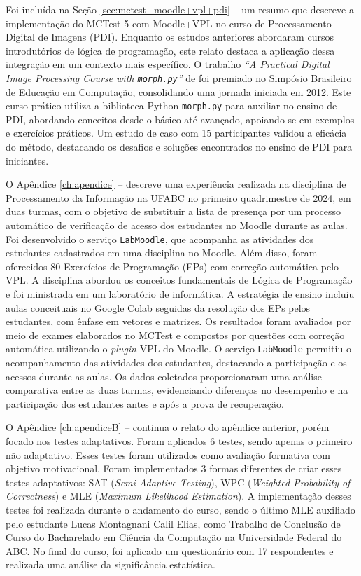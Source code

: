 Foi incluída na Seção \ref{sec:mctest+moodle+vpl+pdi} --  um resumo que descreve a implementação do MCTest-5 com Moodle+VPL no curso de Processamento Digital de Imagens (PDI). Enquanto os estudos anteriores abordaram cursos introdutórios de lógica de programação, este relato destaca a aplicação dessa integração em um contexto mais específico. O trabalho \textit{``A Practical Digital Image Processing Course with \texttt{morph.py}''} de  foi premiado no Simpósio Brasileiro de Educação em Computação, consolidando uma jornada iniciada em 2012. Este curso prático utiliza a biblioteca Python \texttt{morph.py} para auxiliar no ensino de PDI, abordando conceitos desde o básico até avançado, apoiando-se em exemplos e exercícios práticos. Um estudo de caso com 15 participantes validou a eficácia do método, destacando os desafios e soluções encontrados no ensino de PDI para iniciantes.

O Apêndice \ref{ch:apendice} --  descreve uma experiência realizada na disciplina de Processamento da Informação na UFABC no primeiro quadrimestre de 2024, em duas turmas, com o objetivo de substituir a lista de presença por um processo automático de verificação de acesso dos estudantes no Moodle durante as aulas. Foi desenvolvido o serviço \texttt{LabMoodle}, que acompanha as atividades dos estudantes cadastrados em uma disciplina no Moodle. Além disso, foram oferecidos 80 Exercícios de Programação (EPs) com correção automática pelo VPL. A disciplina abordou os conceitos fundamentais de Lógica de Programação e foi ministrada em um laboratório de informática. A estratégia de ensino incluiu aulas conceituais no Google Colab seguidas da resolução dos EPs pelos estudantes, com ênfase em vetores e matrizes. Os resultados foram avaliados por meio de exames elaborados no MCTest e compostos por questões com correção automática utilizando o \textit{plugin} VPL do Moodle. O serviço \texttt{LabMoodle} permitiu o acompanhamento das atividades dos estudantes, destacando a participação e os acessos durante as aulas. Os dados coletados proporcionaram uma análise comparativa entre as duas turmas, evidenciando diferenças no desempenho e na participação dos estudantes antes e após a prova de recuperação. 

O Apêndice \ref{ch:apendiceB} --  continua o relato do apêndice anterior, porém focado nos testes adaptativos. Foram aplicados 6 testes, sendo apenas o primeiro não adaptativo. Esses testes foram utilizados como avaliação formativa com objetivo motivacional. Foram implementados 3 formas diferentes de criar esses testes adaptativos: SAT (\textit{Semi-Adaptive Testing}), WPC (\textit{Weighted Probability of Correctness}) e MLE (\textit{Maximum Likelihood Estimation}). A implementação desses testes foi realizada durante o andamento do curso, sendo o último MLE auxiliado pelo estudante Lucas Montagnani Calil Elias, como Trabalho de Conclusão de Curso do Bacharelado em Ciência da Computação na Universidade Federal do ABC. No final do curso, foi aplicado um questionário com 17 respondentes e realizada uma análise da significância estatística.

